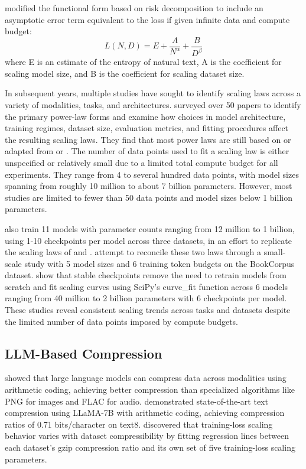\documentclass[10pt]{article} %
\begin{document}
\citet{hoffmann2022scaling} modified the functional form based on risk decomposition to include an asymptotic error term equivalent to the loss if given infinite data and compute budget:
\[
L(N, D) = E + \frac{A}{N^\alpha} + \frac{B}{D^\beta}
\]
where E is an estimate of the entropy of natural text, A is the coefficient for scaling model size, and B is the coefficient for scaling dataset size.

In subsequent years, multiple studies have sought to identify scaling laws across a variety of modalities, tasks, and architectures. \citet{li2025scaling} surveyed over 50 papers to identify the primary power-law forms and examine how choices in model architecture, training regimes, dataset size, evaluation metrics, and fitting procedures affect the resulting scaling laws. They find that most power laws are still based on or adapted from \citet{kaplan2020scaling} or \citet{hoffmann2022scaling}. The number of data points used to fit a scaling law is either unspecified or relatively small due to a limited total compute budget for all experiments. They range from 4 to several hundred data points, with model sizes spanning from roughly 10 million to about 7 billion parameters. However, most studies are limited to fewer than 50 data points and model sizes below 1 billion parameters.

\citet{li2025scaling} also train 11 models with parameter counts ranging from 12 million to 1 billion, using 1-10 checkpoints per model across three datasets, in an effort to replicate the scaling laws of \citet{kaplan2020scaling} and \citet{hoffmann2022scaling}. \citet{pearce2024scaling} attempt to reconcile these two laws through a small-scale study with 5 model sizes and 6 training token budgets on the BookCorpus dataset. \citet{hu2024scaling} show that stable checkpoints remove the need to retrain models from scratch and fit scaling curves using SciPy’s curve\_fit function across 6 models ranging from 40 million to 2 billion parameters with 6 checkpoints per model. These studies reveal consistent scaling trends across tasks and datasets despite the limited number of data points imposed by compute budgets.


\subsection{LLM-Based Compression}

\citet{deletang2024compression} showed that large language models can compress data across modalities using arithmetic coding, achieving better compression than specialized algorithms like PNG for images and FLAC for audio. \citet{kaushik2023llmzip} demonstrated state-of-the-art text compression using LLaMA-7B with arithmetic coding, achieving compression ratios of 0.71 bits/character on text8. \citet{pandey2024compression} discovered that training-loss scaling behavior varies with dataset compressibility by fitting regression lines between each dataset’s gzip compression ratio and its own set of five training-loss scaling parameters.
\end{document}
